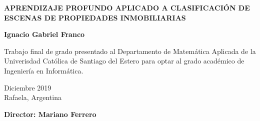 \begin{titlepage}
	
	\begin{center}
		
		\vspace*{4\baselineskip}
	
		
		{\LARGE \textbf{APRENDIZAJE PROFUNDO APLICADO A CLASIFICACIÓN DE ESCENAS DE PROPIEDADES INMOBILIARIAS \\}}
		        \vspace*{1.5\baselineskip}

		
        \vspace*{1,5\baselineskip}

		\large{\textbf{Ignacio Gabriel Franco}}\\
		
		\vspace{1,5\baselineskip}
		
		\large{Trabajo final de grado presentado al Departamento de Matemática Aplicada de la Univerisdad Católica de Santiago del Estero para optar al grado académico de Ingeniería en Informática.} 
		
		\vspace{1,5\baselineskip}
		Diciembre 2019\\
		Rafaela, Argentina 
\vspace{1,5\baselineskip}

		\large{\textbf{Director: Mariano Ferrero}}\\ 

	\end{center}
	
	\vspace*{4\baselineskip}
	
\end{titlepage}